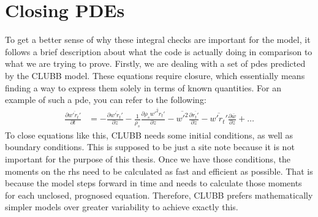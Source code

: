 \section{Closing PDEs}\label{sec:closing_pdes}

To get a better sense of why these integral checks are important for the model, it follows a brief description about what the code is actually doing in comparison to what we are trying to prove.
Firstly, we are dealing with a set of \glspl{pde} predicted by the \gls{CLUBB} model.
These equations require closure, which essentially means finding a way to express them solely in terms of known quantities.
For an example of such a \gls{pde}, you can refer to the following\cite[p. 21]{larson2022clubbsilhs}:
\begin{align*}
    \frac{\partial \overline{w'r_t'}}{\partial t}
    &= -\frac{\partial \overline{w'r_t'}}{\partial z}
    - \frac{1}{\rho_s} \frac{\partial \rho_s \overline{w'^2r_t'}}{\partial z}
    - \overline{w'^2} \frac{\partial \overline{r_t'}}{\partial z}
    - \overline{w'r_t'} \frac{\partial \overline{w}}{\partial z}
    + \ldots
\end{align*}
To close equations like this, \gls{CLUBB} needs some initial conditions, as well as boundary conditions.
This is supposed to be just a site note because it is not important for the purpose of this thesis.
Once we have those conditions, the moments on the \gls{rhs} need to be calculated as fast and efficient as possible.
That is because the model steps forward in time and needs to calculate those moments for each unclosed, prognosed equation.
Therefore, \gls{CLUBB} prefers mathematically simpler models over greater variability to achieve exactly this.